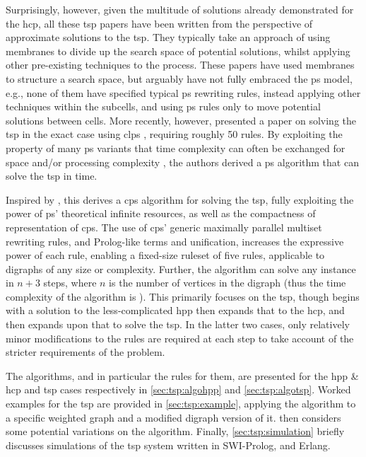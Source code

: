 Surprisingly, however, given the multitude of solutions already demonstrated for the \gls{hcp}, all these \gls{tsp} papers have been written from the perspective of approximate solutions to the \gls{tsp}.  They typically take an approach of using membranes to divide up the search space of potential solutions, whilst applying other pre-existing techniques to the process.  These papers have used membranes to structure a search space, but arguably have not fully embraced the \gls{ps} model, e.g., none of them have specified typical \gls{ps} rewriting rules, instead applying other techniques within the subcells, and using \gls{ps} rules only to move potential solutions between cells.  More recently, however, \citeauthor{Guo2017} presented a paper on solving the \gls{tsp} in the exact case using \gls{clps} \cite{Guo2017}, requiring roughly 50 rules.  By exploiting the property of many \gls{ps} variants that time complexity can often be exchanged for space and/or processing complexity \cite{Paun1999,Paun2002a,Jimenez2003,Song2017}, the authors derived a \gls{ps} algorithm that can solve the \gls{tsp} in  time.

Inspired by \cite{Guo2017}, this  derives a \gls{cps} algorithm for solving the \gls{tsp}, fully exploiting the power of \gls{ps}' theoretical infinite resources, as well as the compactness of representation of \gls{cps}.  The use of \gls{cps}' generic maximally parallel multiset rewriting rules, and Prolog-like terms and unification, increases the expressive power of each rule, enabling a fixed-size ruleset of five rules, applicable to digraphs of any size or complexity.   Further, the algorithm can solve any instance in \(n + 3\) steps, where \(n\) is the number of vertices in the digraph (thus the time complexity of the algorithm is ).  This  primarily focuses on the \gls{tsp}, though begins with a solution to the less-complicated \gls{hpp} then expands that to the \gls{hcp}, and then expands upon that to solve the \gls{tsp}.  In the latter two cases, only relatively minor modifications to the rules are required at each step to take account of the stricter requirements of the problem.

The algorithms, and in particular the rules for them, are presented for the \gls{hpp} \& \gls{hcp} and \gls{tsp} cases respectively in \cref{sec:tsp:algohpp} and \cref{sec:tsp:algotsp}.  Worked examples for the \gls{tsp} are provided in \cref{sec:tsp:example}, applying the algorithm to a specific weighted graph and a modified digraph version of it.   then considers some potential variations on the algorithm.  Finally, \cref{sec:tsp:simulation} briefly discusses simulations of the \gls{tsp} system written in SWI-Prolog, \fsharp{} and Erlang.